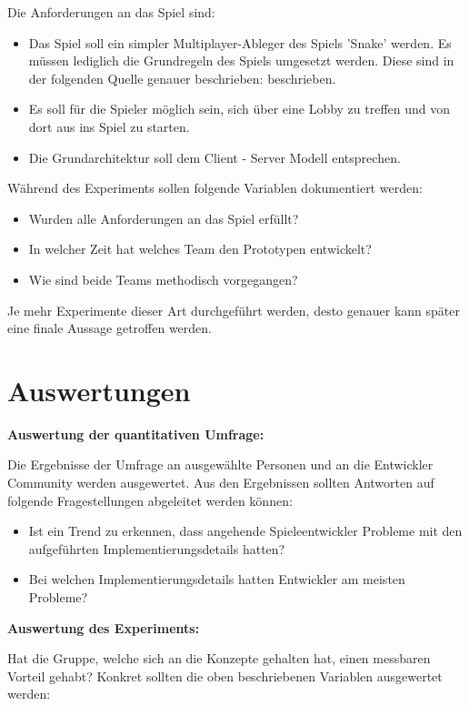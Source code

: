 Die Anforderungen an das Spiel sind:

\begin{itemize}
	\item Das Spiel soll ein simpler Multiplayer-Ableger des Spiels 'Snake' werden. Es müssen lediglich die Grundregeln des Spiels umgesetzt werden. Diese sind in der folgenden Quelle genauer beschrieben: \cite{.22.02.2022} beschrieben.
	\item Es soll für die Spieler möglich sein, sich über eine Lobby zu treffen und von dort aus ins Spiel zu starten.
	\item Die Grundarchitektur soll dem Client - Server Modell entsprechen.
\end{itemize}

Während des Experiments sollen folgende Variablen dokumentiert werden:

\begin{itemize}
	\item Wurden alle Anforderungen an das Spiel erfüllt?
	\item In welcher Zeit hat welches Team den Prototypen entwickelt?
	\item Wie sind beide Teams methodisch vorgegangen?
\end{itemize}

Je mehr Experimente dieser Art durchgeführt werden, desto genauer kann später eine finale Aussage getroffen werden.

\section{Auswertungen}
\textbf{Auswertung der quantitativen Umfrage:}

Die Ergebnisse der Umfrage an ausgewählte Personen und an die Entwickler Community werden ausgewertet. Aus den Ergebnissen sollten Antworten auf folgende Fragestellungen abgeleitet werden können:

\begin{itemize}
	\item Ist ein Trend zu erkennen, dass angehende Spieleentwickler Probleme mit den aufgeführten Implementierungsdetails hatten?
	\item Bei welchen Implementierungsdetails hatten Entwickler am meisten Probleme?
\end{itemize}

\textbf{Auswertung des Experiments:}

Hat die Gruppe, welche sich an die Konzepte gehalten hat, einen messbaren Vorteil gehabt? Konkret sollten die oben beschriebenen Variablen ausgewertet werden:

